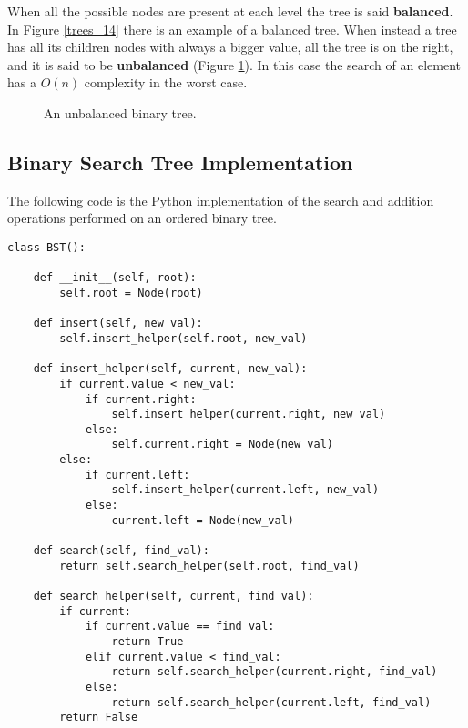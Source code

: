 When all the possible nodes are present at each level the tree is said \textbf{balanced}. In Figure \ref{trees_14} there is an example of a balanced tree.
When instead a tree has all its children nodes with always a bigger value, all the tree is on the right, and it is said to be \textbf{unbalanced} (Figure \ref{trees_15}). In this case the search of an element has a \(O(n)\) complexity in the worst case.

\begin{figure}[H]
\centering
{}
\caption[An unbalanced binary tree.]{An unbalanced binary tree.}
\label{trees_15}
\end{figure}

\subsection{Binary Search Tree Implementation}
The following code is the Python implementation of the search and addition operations performed on an ordered binary tree.

\begin{lstlisting}[firstnumber=1, caption={implementation of insert and search operation for a binary search tree.}]
class BST():

	def __init__(self, root):
		self.root = Node(root)

	def insert(self, new_val):
		self.insert_helper(self.root, new_val)
	
	def insert_helper(self, current, new_val):
		if current.value < new_val:
			if current.right:
				self.insert_helper(current.right, new_val)
			else:
				self.current.right = Node(new_val)
		else:
			if current.left:
				self.insert_helper(current.left, new_val)
			else:
				current.left = Node(new_val)
	
	def search(self, find_val):
		return self.search_helper(self.root, find_val)
	
	def search_helper(self, current, find_val):
		if current:
			if current.value == find_val:
				return True
			elif current.value < find_val:
				return self.search_helper(current.right, find_val)
			else:
				return self.search_helper(current.left, find_val)
		return False
\end{lstlisting}

